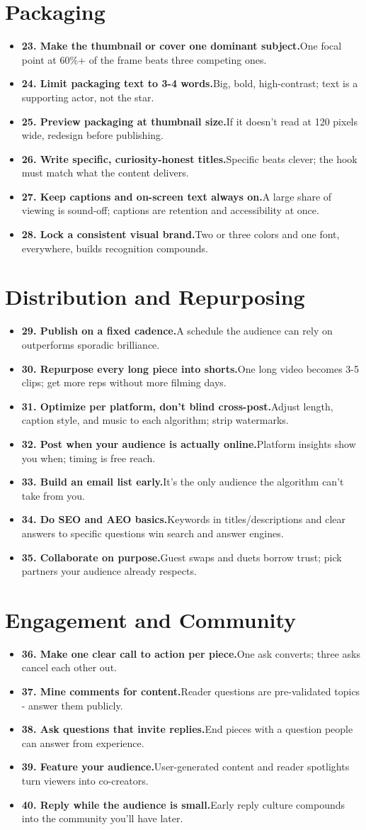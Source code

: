 \documentclass[11pt]{article}
\newcommand{\tip}[2]{\item \textbf{#1.}\enspace #2}
\newcommand{\tlabel}{\textcolor{accent}{\small$\blacktriangleright$}}
\begin{document}
\section*{Packaging}
\begin{itemize}[label=\tlabel]
\tip{23. Make the thumbnail or cover one dominant subject}{One focal point at 60\%+ of the frame beats three competing ones.}
\tip{24. Limit packaging text to 3-4 words}{Big, bold, high-contrast; text is a supporting actor, not the star.}
\tip{25. Preview packaging at thumbnail size}{If it doesn't read at 120 pixels wide, redesign before publishing.}
\tip{26. Write specific, curiosity-honest titles}{Specific beats clever; the hook must match what the content delivers.}
\tip{27. Keep captions and on-screen text always on}{A large share of viewing is sound-off; captions are retention and accessibility at once.}
\tip{28. Lock a consistent visual brand}{Two or three colors and one font, everywhere, builds recognition compounds.}
\end{itemize}
\section*{Distribution and Repurposing}
\begin{itemize}[label=\tlabel]
\tip{29. Publish on a fixed cadence}{A schedule the audience can rely on outperforms sporadic brilliance.}
\tip{30. Repurpose every long piece into shorts}{One long video becomes 3-5 clips; get more reps without more filming days.}
\tip{31. Optimize per platform, don't blind cross-post}{Adjust length, caption style, and music to each algorithm; strip watermarks.}
\tip{32. Post when your audience is actually online}{Platform insights show you when; timing is free reach.}
\tip{33. Build an email list early}{It's the only audience the algorithm can't take from you.}
\tip{34. Do SEO and AEO basics}{Keywords in titles/descriptions and clear answers to specific questions win search and answer engines.}
\tip{35. Collaborate on purpose}{Guest swaps and duets borrow trust; pick partners your audience already respects.}
\end{itemize}
\section*{Engagement and Community}
\begin{itemize}[label=\tlabel]
\tip{36. Make one clear call to action per piece}{One ask converts; three asks cancel each other out.}
\tip{37. Mine comments for content}{Reader questions are pre-validated topics - answer them publicly.}
\tip{38. Ask questions that invite replies}{End pieces with a question people can answer from experience.}
\tip{39. Feature your audience}{User-generated content and reader spotlights turn viewers into co-creators.}
\tip{40. Reply while the audience is small}{Early reply culture compounds into the community you'll have later.}
\end{itemize}
\end{document}
